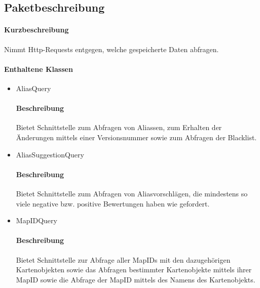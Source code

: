 \subsection*{Paketbeschreibung}%
\paragraph*{Kurzbeschreibung}
Nimmt Http-Requests entgegen, welche gespeicherte Daten abfragen.
\paragraph*{Enthaltene Klassen}
\begin{itemize}
    \item AliasQuery
    		\paragraph*{Beschreibung}
            Bietet Schnittstelle zum Abfragen von Aliassen, zum Erhalten der Änderungen mittels einer Versionsnummer sowie zum Abfragen der Blacklist.
    \item AliasSuggestionQuery
    		\paragraph*{Beschreibung}
    		Bietet Schnittstelle zum Abfragen von Aliasvorschlägen, die mindestens so viele negative bzw. positive Bewertungen haben wie gefordert.
    \item MapIDQuery
    		\paragraph*{Beschreibung}
    		Bietet Schnittstelle zur Abfrage aller MapIDs mit den dazugehörigen Kartenobjekten sowie das Abfragen bestimmter Kartenobjekte mittels ihrer MapID sowie die Abfrage
            der MapID mittels des Namens des Kartenobjekts.

\end{itemize}